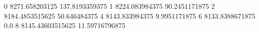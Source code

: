 0 8271.658203125 137.8193359375
1 8224.083984375 90.2451171875
2 8184.4853515625 50.646484375
4 8143.833984375 9.9951171875
6 8133.8388671875 0.0
8 8145.43603515625 11.59716796875

